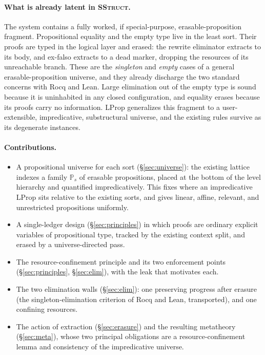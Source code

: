 \documentclass[11pt]{article}
\newcommand{\Prop}[1]{\mathbb{P}_{#1}}            %
\theoremstyle{definition}
\theoremstyle{plain}
\begin{document}
\paragraph{What is already latent in \textsc{SStruct}.}
The system contains a fully worked, if special-purpose, erasable-proposition
fragment. Propositional equality and the empty type live in the least sort. Their
proofs are typed in the logical layer and erased: the rewrite eliminator extracts
to its body, and ex-falso extracts to a dead marker, dropping the resources of
its unreachable branch. These are the \emph{singleton} and \emph{empty} cases of
a general erasable-proposition universe, and they already discharge the two
standard concerns with Rocq and Lean. Large elimination out of the empty type is
sound because it is uninhabited in any closed configuration, and equality erases
because its proofs carry no information. \textsf{LProp} generalizes this fragment
to a user-extensible, impredicative, substructural universe, and the existing
rules survive as its degenerate instances.

\paragraph{Contributions.}
\begin{itemize}
\item A propositional universe for each sort (\S\ref{sec:universe}): the existing
lattice indexes a family $\Prop{s}$ of erasable propositions, placed at the bottom
of the level hierarchy and quantified impredicatively. This fixes where an
impredicative \textsf{LProp} sits relative to the existing sorts, and gives
linear, affine, relevant, and unrestricted propositions uniformly.
\item A single-ledger design (\S\ref{sec:principles}) in which proofs are ordinary
explicit variables of propositional type, tracked by the existing context split,
and erased by a universe-directed pass.
\item The resource-confinement principle and its two enforcement points
(\S\ref{sec:principles}, \S\ref{sec:elim}), with the leak that motivates each.
\item The two elimination walls (\S\ref{sec:elim}): one preserving progress after
erasure (the singleton-elimination criterion of Rocq and Lean, transported), and
one confining resources.
\item The action of extraction (\S\ref{sec:erasure}) and the resulting metatheory
(\S\ref{sec:meta}), whose two principal obligations are a resource-confinement
lemma and consistency of the impredicative universe.
\end{itemize}
\end{document}
